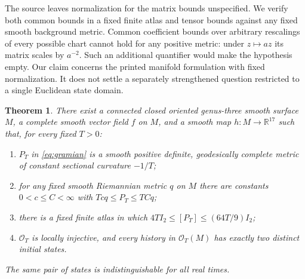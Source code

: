 \documentclass[11pt]{article}
\newtheorem{theorem}{Theorem}
\newcommand{\R}{\mathbb R}
\newcommand{\Obs}{\mathcal O}
\begin{document}
The source leaves normalization for the matrix bounds unspecified. We verify
both common bounds in a fixed finite atlas and tensor bounds against any fixed
smooth background metric. Common coefficient bounds over arbitrary rescalings
of every possible chart cannot hold for any positive metric: under $z\mapsto az$
its matrix scales by $a^{-2}$. Such an additional quantifier would make the
hypothesis empty. Our claim concerns the printed manifold formulation with
fixed normalization. It does not settle a separately strengthened question
restricted to a single Euclidean state domain.

\begin{theorem}\label{thm:counterexample}
There exist a connected closed oriented genus-three smooth surface $M$, a
complete smooth vector field $f$ on $M$, and a smooth map $h:M\to\R^{17}$ such
that, for every fixed $T>0$:
\begin{enumerate}
\item $P_T$ in \eqref{eq:gramian} is a smooth positive definite, geodesically
complete metric of constant sectional curvature $-1/T$;
\item for any fixed smooth Riemannian metric $q$ on $M$ there are constants
$0<c\leq C<\infty$ with $Tcq\leq P_T\leq TCq$;
\item there is a fixed finite atlas in which
$4T I_2\leq [P_T]\leq (64T/9)I_2$;
\item $\Obs_T$ is locally injective, and every history in $\Obs_T(M)$ has exactly
two distinct initial states.
\end{enumerate}
The same pair of states is indistinguishable for all real times.
\end{theorem}
\end{document}
